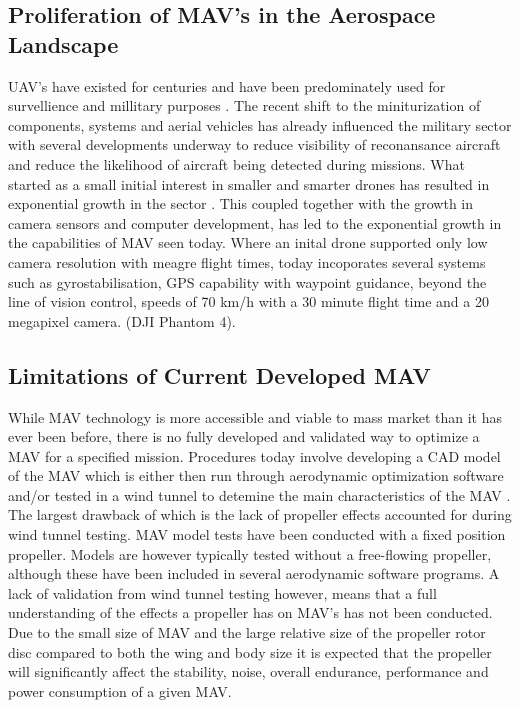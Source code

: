 {\subsection{Proliferation of MAV's in the Aerospace Landscape}
\label{subsec:ProliferationMAVs}

UAV's have existed for centuries and have been predominately used for survellience and millitary purposes . The recent shift to the miniturization of components, systems and aerial vehicles has already influenced the military sector with several developments underway to reduce visibility of reconansance aircraft and reduce the likelihood of aircraft being detected during missions. What started as a small initial interest in smaller and smarter drones has resulted in exponential growth in the sector . This coupled together with the growth in camera sensors and computer development, has led to the exponential growth in the capabilities of MAV seen today. Where an inital drone supported only low camera resolution with meagre flight times, today incoporates several systems such as gyrostabilisation, GPS capability with waypoint guidance, beyond the line of vision control, speeds of 70 km/h with a 30 minute flight time and a 20 megapixel camera. (DJI Phantom 4). \\


\subsection{Limitations of Current Developed MAV}
\label{subsec:Limitations}
While MAV technology is more accessible and viable to mass market than it has ever been before, there is no fully developed and validated way to optimize a MAV for a specified mission. Procedures today involve developing a CAD model of the MAV which is either then run through aerodynamic optimization software and/or tested in a wind tunnel to detemine the main characteristics of the MAV \cite{Paulson2017}. The largest drawback of which is the lack of propeller effects accounted for during wind tunnel testing. MAV model tests have been conducted with a fixed position propeller. Models are however typically tested without a free-flowing propeller, although these have been included in several aerodynamic software programs.  A lack of validation from wind tunnel testing however, means that a full understanding of the effects a propeller has on MAV's has not been conducted. Due to the small size of MAV and the large relative size of the propeller rotor disc compared to both the wing and body size it is expected that the propeller will significantly affect the stability, noise, overall endurance, performance and power consumption of a given MAV. 

}
